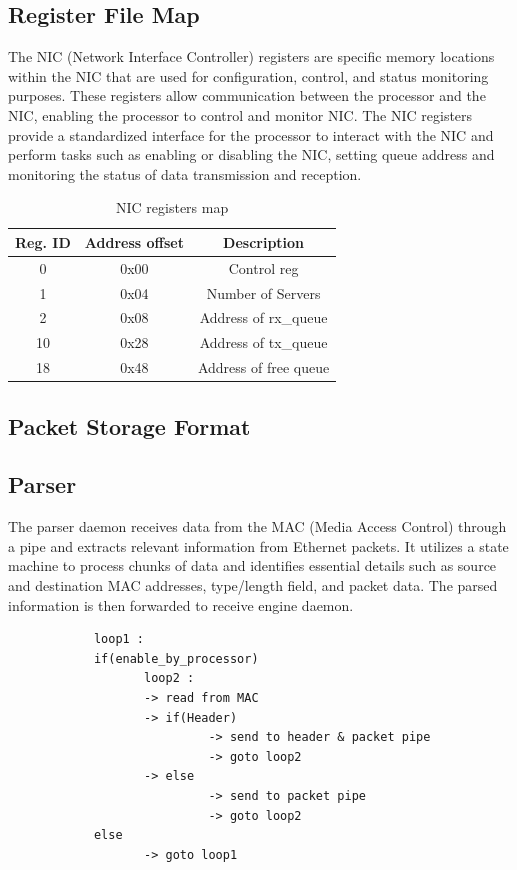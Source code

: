 \documentclass[12pt]{report}
\begin{document}
		\subsection{Register File Map} \label{subsec:NIC_REG}
				The NIC (Network Interface Controller) registers are specific memory locations within the NIC that are used for configuration, control, and status monitoring purposes. These registers allow communication between the processor and the NIC, enabling the processor to control and monitor NIC. The NIC registers provide a standardized interface for the processor to interact with the NIC and perform tasks such as enabling or disabling the NIC, setting queue address and monitoring the status of data transmission and reception.

			\begin{table}[h!]
				\centering
				\begin{tabular}{|c|c|c|}
					\hline
					Reg. ID& Address offset & Description  \\ \hline
					0  & 0x00  & Control reg    \\ \hline
					1  & 0x04  & Number of Servers    \\ \hline
					2  & 0x08  & Address of rx\_queue    \\ \hline
					10  & 0x28  & Address of tx\_queue    \\ \hline
					18  & 0x48  & Address of free queue    \\ \hline
				\end{tabular}
				\caption{NIC registers map}
				\label{tab:NIC_REG}
			\end{table}

		\subsection{Packet Storage Format}

		\subsection{Parser}
				The parser daemon receives data from the MAC (Media Access Control) through a pipe and extracts relevant information from Ethernet packets. It utilizes a state machine to process chunks of data and identifies essential details such as source and destination MAC addresses, type/length field, and packet data. The parsed information is then forwarded to receive engine daemon.
		\begin{verbatim}
			loop1 :
			if(enable_by_processor)
			       loop2 :
			       -> read from MAC
			       -> if(Header) 
			                -> send to header & packet pipe
			                -> goto loop2
			       -> else
			       	        -> send to packet pipe
			       	        -> goto loop2
			else
			       -> goto loop1
		\end{verbatim}
\end{document}
